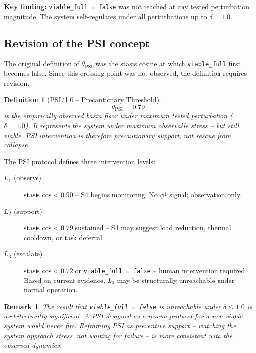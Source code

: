 \documentclass[11pt, a4paper]{article}
\newtheorem{definition}{Definition}
\newtheorem{remark}{Remark}
\begin{document}
\textbf{Key finding:} \texttt{viable\_full = false} was not reached at
any tested perturbation magnitude.
The system self-regulates under all perturbations up to $\delta = 1.0$.

\subsection{Revision of the PSI concept}

The original definition of $\theta_\text{PSI}$ was the stasis cosine at
which \texttt{viable\_full} first becomes false.
Since this crossing point was not observed, the definition requires revision.

\begin{definition}[PSI/1.0 -- Precautionary Threshold]
\label{def:psi}
\begin{equation}
\theta_\text{PSI} = 0.79
\end{equation}
is the empirically observed basin floor under maximum tested perturbation
($\delta = 1.0$).
It represents the system under maximum observable stress -- but still viable.
PSI intervention is therefore \emph{precautionary support}, not rescue
from collapse.
\end{definition}

The PSI protocol defines three intervention levels:
\begin{description}
  \item[$L_1$ (observe)] $\text{stasis\_cos} < 0.90$ -- S4 begins monitoring.
        No $\phi^\downarrow$ signal; observation only.
  \item[$L_2$ (support)] $\text{stasis\_cos} < 0.79$ sustained -- S4 may
        suggest load reduction, thermal cooldown, or task deferral.
  \item[$L_3$ (escalate)] $\text{stasis\_cos} < 0.72$ or
        \texttt{viable\_full = false} -- human intervention required.
        Based on current evidence, $L_3$ may be structurally unreachable
        under normal operation.
\end{description}

\begin{remark}
The result that \texttt{viable\_full = false} is unreachable under
$\delta \le 1.0$ is architecturally significant.
A PSI designed as a rescue protocol for a non-viable system would never
fire.
Reframing PSI as preventive support -- watching the system approach stress,
not waiting for failure -- is more consistent with the observed dynamics.
\end{remark}
\end{document}

